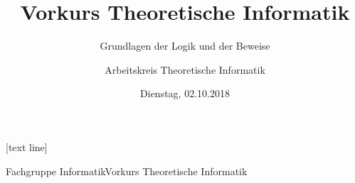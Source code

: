 \usepackage{appendixnumberbeamer}
\usepackage[ngerman]{babel}
\usepackage{booktabs}
\usepackage[scale=2]{ccicons}
\usepackage{hyperref}
\usepackage{pgfplots}
\usepackage{xspace}
\newcommand{\themename}{\textbf{\textsc{metropolis}}\xspace}
\usepackage{blindtext}
\usepackage{graphicx}
\usepackage{comment}
\usepackage{mathtools}
\usepackage{amsmath}
\usepackage{amssymb}
\usepackage{proof}
\usepackage{tabularx}
\renewcommand{\figurename}{Abb.}
\usepackage{marvosym}
\usepackage{mathtools}
\newcommand{\defeq}{\vcentcolon=}
\newcommand{\eqdef}{=\vcentcolon}
\newcommand{\emptyWord}{\varepsilon}
\newcommand{\SigmaStern}{\Sigma^{*}}
\newcommand{\absval}[1]{|#1|}
[text line] 
{\parbox{\linewidth}{Fachgruppe Informatik\hfill\insertpagenumber\hfill Vorkurs Theoretische Informatik\vspace{0.2in}}}
\title{Vorkurs Theoretische Informatik}
\subtitle{Grundlagen der Logik und der Beweise}
\date{Dienstag, 02.10.2018}
\author{Arbeitskreis Theoretische Informatik}
